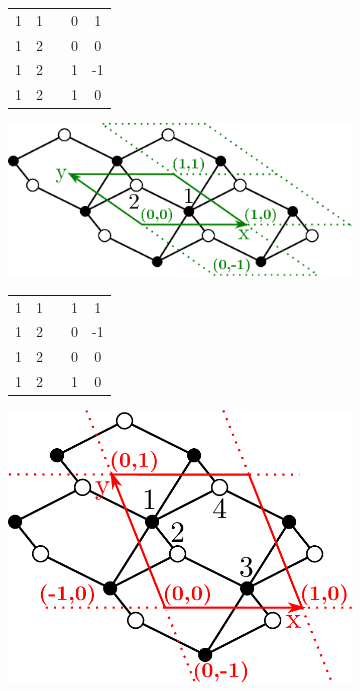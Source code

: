 \documentclass[main.tex]{subfiles}
\begin{document}
\begin{figure}[t]
\begin{subfigure}[b]{0.35\linewidth}
		\centering\begin{tabular}{ccccc}
			1&1&&0&1\\
			1&2&&0&0\\
			1&2&&1&-1\\
			1&2&&1&0
		\end{tabular}
		\vspace{-0.5em}
	\end{subfigure}%
	\begin{subfigure}[b]{0.35\linewidth}
		\hspace{-2em}\includegraphics[width=1\linewidth]{figures/topology/cells_other.pdf}
		\vspace{1em}
		
		\centering\begin{tabular}{ccccc}
			1&1&&1&1\\
			1&2&&0&-1\\
			1&2&&0&0\\
			1&2&&1&0
		\end{tabular}
		\vspace{-0.5em}
	\end{subfigure}%
	\begin{subfigure}[b]{0.35\linewidth}
		\centering
		\hspace{-2em}\includegraphics[width=0.63\linewidth]{figures/topology/cells_super.pdf}
		\vspace{-0.5em}
		

\end{subfigure}
\end{figure}
\end{document}
